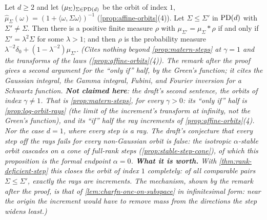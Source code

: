 \begin{proposition}
\label{prop:matern-cross-shape}
\leanok
Let $d \ge 2$ and let $(\mu_\Sigma)_{\Sigma\in\mathrm{PD}(d)}$ be the \Matern{} orbit of index $1$,
$\widehat\mu_\Sigma(\omega) = (1 + \langle\omega,\Sigma\omega\rangle)^{-1}$
(\ref{prop:affine-orbits}(4)). Let $\Sigma \le \Sigma'$ in $\mathrm{PD}(d)$ with $\Sigma' \ne \Sigma$.
Then there is a positive finite measure $\rho$ with $\mu_{\Sigma'} = \mu_\Sigma * \rho$ if and only
if $\Sigma' = \lambda^2\Sigma$ for some $\lambda > 1$; and then $\rho$ is the probability measure
$\lambda^{-2}\delta_0 + (1-\lambda^{-2})\mu_{\Sigma'}$.
\statusT\quad\emph{(Cites nothing beyond \ref{prop:matern-steps} at $\gamma = 1$ and the transforms
of the \Matern{} laws (\ref{prop:affine-orbits}(4)). The remark after the proof gives a second
argument for the ``only if'' half, by the Green's function; it cites the Gaussian integral, the Gamma
integral, Fubini, and Fourier inversion for a Schwartz function. \textbf{Not claimed here}: the
draft's second sentence, the \Matern{} orbits of index $\gamma \ne 1$. That is
\ref{prop:matern-steps}, for every $\gamma > 0$: its ``only if'' half is \ref{prop:log-orbit-rays}
(the limit of the increment's transform at infinity, not the Green's function), and its ``if'' half
the ray increments of \ref{prop:affine-orbits}(4). Nor the case $d = 1$, where every step is a ray. The draft's
conjecture that every step off the rays fails for every non-Gaussian orbit is false: the
isotropic $\alpha$-stable orbit cascades on a cone of full-rank steps (\ref{prop:stable-step-cone}),
of which this proposition is the formal endpoint $\alpha = 0$.
\textbf{What it is worth.} With \ref{thm:rank-deficient-step} this closes the \Matern{} orbit of
index $1$ completely: of all comparable pairs $\Sigma \le \Sigma'$, exactly the rays are
increments. The mechanism, shown by the remark after the proof, is that of
\ref{lem:charfn-one-on-subspace} in infinitesimal form: near the origin the increment would have to
remove mass from the directions the step widens least.)}
\end{proposition}

